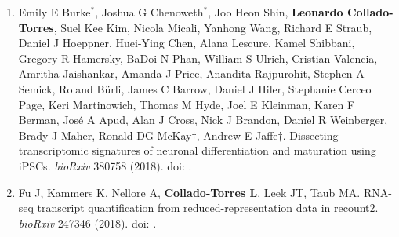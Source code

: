 \begin{enumerate}
        \item Emily E Burke$^{*}$, Joshua G Chenoweth$^{*}$, Joo Heon Shin, \textbf{Leonardo Collado-Torres}, Suel Kee Kim, Nicola Micali, Yanhong Wang, Richard E Straub, Daniel J Hoeppner, Huei-Ying Chen, Alana Lescure, Kamel Shibbani, Gregory R Hamersky, BaDoi N Phan, William S Ulrich, Cristian Valencia, Amritha Jaishankar, Amanda J Price, Anandita Rajpurohit, Stephen A Semick, Roland Bürli, James C Barrow, Daniel J Hiler, Stephanie Cerceo Page, Keri Martinowich, Thomas M Hyde, Joel E Kleinman, Karen F Berman, José A Apud, Alan J Cross, Nick J Brandon, Daniel R Weinberger, Brady J Maher, Ronald DG McKay$\dagger$, Andrew E Jaffe$\dagger$. Dissecting transcriptomic signatures of neuronal differentiation and maturation using iPSCs. \emph{bioRxiv} 380758 (2018). doi: .
        
        \item Fu J, Kammers K, Nellore A, \textbf{Collado-Torres L}, Leek JT, Taub MA. RNA-seq transcript quantification from reduced-representation data in recount2. \emph{bioRxiv} 247346 (2018). doi: .
    \end{enumerate}

